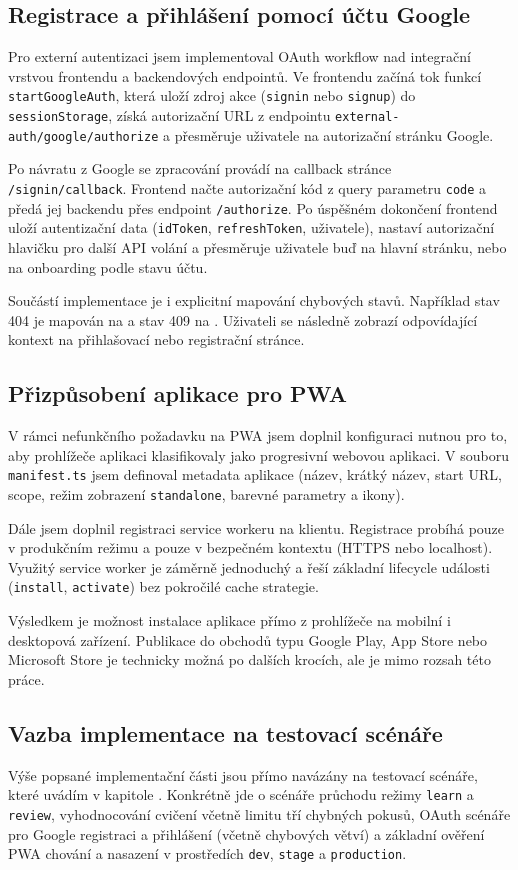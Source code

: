 \subsection{Registrace a přihlášení pomocí účtu Google}

Pro externí autentizaci jsem implementoval OAuth workflow nad integrační vrstvou frontendu a backendových endpointů. Ve frontendu začíná tok funkcí \texttt{startGoogleAuth}, která uloží zdroj akce (\texttt{signin} nebo \texttt{signup}) do \texttt{sessionStorage}, získá autorizační URL z endpointu \texttt{external-auth/google/authorize} a přesměruje uživatele na autorizační stránku Google.

Po návratu z Google se zpracování provádí na callback stránce \texttt{/signin/callback}. Frontend načte autorizační kód z query parametru \texttt{code} a předá jej backendu přes endpoint \texttt{/authorize}. Po úspěšném dokončení frontend uloží autentizační data (\texttt{idToken}, \texttt{refreshToken}, uživatele), nastaví autorizační hlavičku pro další API volání a přesměruje uživatele buď na hlavní stránku, nebo na onboarding podle stavu účtu.

Součástí implementace je i explicitní mapování chybových stavů. Například stav 404 je mapován na  a stav 409 na . Uživateli se následně zobrazí odpovídající kontext na přihlašovací nebo registrační stránce.

\subsection{Přizpůsobení aplikace pro PWA}

V rámci nefunkčního požadavku na PWA jsem doplnil konfiguraci nutnou pro to, aby prohlížeče aplikaci klasifikovaly jako progresivní webovou aplikaci. V souboru \texttt{manifest.ts} jsem definoval metadata aplikace (název, krátký název, start URL, scope, režim zobrazení \texttt{standalone}, barevné parametry a ikony).

Dále jsem doplnil registraci service workeru na klientu. Registrace probíhá pouze v produkčním režimu a pouze v bezpečném kontextu (HTTPS nebo localhost). Využitý service worker je záměrně jednoduchý a řeší základní lifecycle události (\texttt{install}, \texttt{activate}) bez pokročilé cache strategie.

Výsledkem je možnost instalace aplikace přímo z prohlížeče na mobilní i desktopová zařízení. Publikace do obchodů typu Google Play, App Store nebo Microsoft Store je technicky možná po dalších krocích, ale je mimo rozsah této práce.

\subsection{Vazba implementace na testovací scénáře}

Výše popsané implementační části jsou přímo navázány na testovací scénáře, které uvádím v kapitole . Konkrétně jde o scénáře průchodu režimy \texttt{learn} a \texttt{review}, vyhodnocování cvičení včetně limitu tří chybných pokusů, OAuth scénáře pro Google registraci a přihlášení (včetně chybových větví) a základní ověření PWA chování a nasazení v prostředích \texttt{dev}, \texttt{stage} a \texttt{production}.
